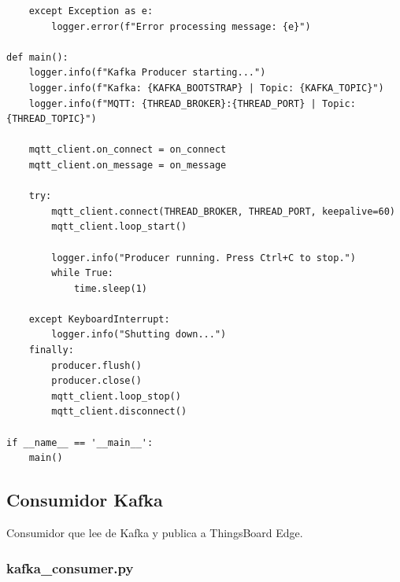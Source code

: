 \begin{verbatim}
    except Exception as e:
        logger.error(f"Error processing message: {e}")

def main():
    logger.info(f"Kafka Producer starting...")
    logger.info(f"Kafka: {KAFKA_BOOTSTRAP} | Topic: {KAFKA_TOPIC}")
    logger.info(f"MQTT: {THREAD_BROKER}:{THREAD_PORT} | Topic: {THREAD_TOPIC}")
    
    mqtt_client.on_connect = on_connect
    mqtt_client.on_message = on_message
    
    try:
        mqtt_client.connect(THREAD_BROKER, THREAD_PORT, keepalive=60)
        mqtt_client.loop_start()
        
        logger.info("Producer running. Press Ctrl+C to stop.")
        while True:
            time.sleep(1)
    
    except KeyboardInterrupt:
        logger.info("Shutting down...")
    finally:
        producer.flush()
        producer.close()
        mqtt_client.loop_stop()
        mqtt_client.disconnect()

if __name__ == '__main__':
    main()
\end{verbatim}

\subsection{Consumidor Kafka}

Consumidor que lee de Kafka y publica a ThingsBoard Edge.

\subsubsection{kafka\_consumer.py}

